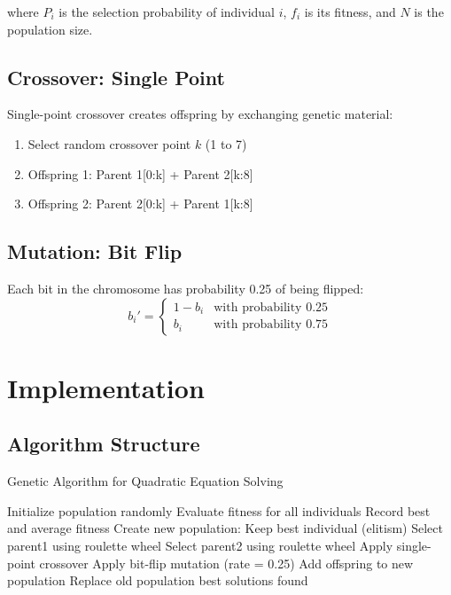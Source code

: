 \documentclass[11pt,a4paper]{article}
\begin{document}
where $P_i$ is the selection probability of individual $i$, $f_i$ is its fitness, and $N$ is the population size.

\subsection{Crossover: Single Point}
Single-point crossover creates offspring by exchanging genetic material:
\begin{enumerate}
    \item Select random crossover point $k$ (1 to 7)
    \item Offspring 1: Parent 1[0:k] + Parent 2[k:8]
    \item Offspring 2: Parent 2[0:k] + Parent 1[k:8]
\end{enumerate}

\subsection{Mutation: Bit Flip}
Each bit in the chromosome has probability 0.25 of being flipped:
\begin{equation}
b_i' = \begin{cases}
1 - b_i & \text{with probability 0.25} \\
b_i & \text{with probability 0.75}
\end{cases}
\end{equation}

\section{Implementation}

\subsection{Algorithm Structure}

\begin{algorithm}[H]
\caption{Genetic Algorithm for Quadratic Equation Solving}
\begin{algorithmic}[1]
    \State Initialize population randomly
        \State Evaluate fitness for all individuals
        \State Record best and average fitness
        \State Create new population:
        \State \quad Keep best individual (elitism)
            \State Select parent1 using roulette wheel
            \State Select parent2 using roulette wheel  
            \State Apply single-point crossover
            \State Apply bit-flip mutation (rate = 0.25)
            \State Add offspring to new population
        \EndWhile
        \State Replace old population
    \EndFor
    \State \Return best solutions found
\EndProcedure
\end{algorithmic}
\end{algorithm}
\end{document}
